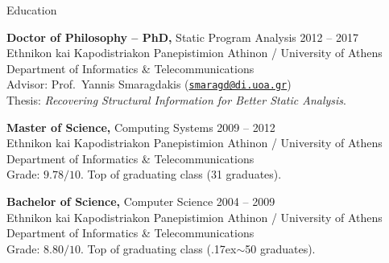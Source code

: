 \documentclass{resume}
\begin{document}
\newcommand{\mytilde}{\raise.17ex\hbox{$\scriptstyle\mathtt{\sim}$}}



\begin{rSection}{Education}

{\bf Doctor of Philosophy -- PhD,} Static Program Analysis \hfill {2012 -- 2017} \\
Ethnikon kai Kapodistriakon Panepistimion Athinon / University of Athens \\
Department of Informatics \& Telecommunications \\
Advisor: Prof.~Yannis Smaragdakis
(\href{mailto:smaragd@di.uoa.gr}{\nolinkurl{smaragd@di.uoa.gr}}) \\
Thesis: \emph{Recovering Structural Information for Better Static Analysis}.

{\bf Master of Science,} Computing Systems \hfill {2009 -- 2012} \\
Ethnikon kai Kapodistriakon Panepistimion Athinon / University of Athens \\
Department of Informatics \& Telecommunications \\
Grade: $9.78 / 10$. Top of graduating class (31 graduates).

{\bf Bachelor of Science,} Computer Science \hfill {2004 -- 2009}  \\
Ethnikon kai Kapodistriakon Panepistimion Athinon / University of Athens \\
Department of Informatics \& Telecommunications \\
Grade: $8.80 / 10$. Top of graduating class (\mytilde{}50 graduates).

\end{rSection}

\end{document}
